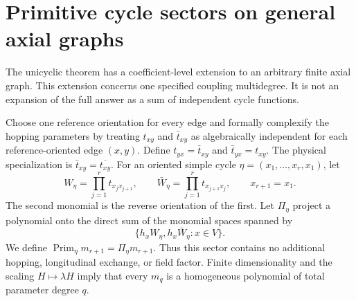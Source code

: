 \section{Primitive cycle sectors on general axial graphs}
\label{sec:primitive-cycles}

The unicyclic theorem has a coefficient-level extension to an arbitrary
finite axial graph.  This extension concerns one specified coupling
multidegree.  It is not an expansion of the full answer as a sum of
independent cycle functions.

Choose one reference orientation for every edge and formally complexify the
hopping parameters by treating $t_{xy}$ and $\bar t_{xy}$ as algebraically
independent for each reference-oriented edge $(x,y)$.  Define
$t_{yx}=\bar t_{xy}$ and $\bar t_{yx}=t_{xy}$.  The physical specialization
is $\bar t_{xy}=\overline{t_{xy}}$.  For an oriented simple cycle
$\eta=(x_1,\ldots,x_r,x_1)$, let
\begin{equation}
 W_\eta=\prod_{j=1}^r t_{x_jx_{j+1}},
 \qquad
 \bar W_\eta=\prod_{j=1}^r t_{x_{j+1}x_j},
 \qquad x_{r+1}=x_1.
 \label{eq:primitive-W-eta}
\end{equation}
The second monomial is the reverse orientation of the first.  Let
$\Pi_\eta$ project a polynomial onto the direct sum of the monomial spaces
spanned by
\begin{equation*}
 \{h_xW_\eta,h_x\bar W_\eta:x\in V\}.
\end{equation*}
We define
$\operatorname{Prim}_\eta m_{r+1}=\Pi_\eta m_{r+1}$.  Thus this sector
contains no additional hopping, longitudinal exchange, or field factor.
Finite dimensionality and the scaling $H\mapsto\lambda H$ imply that every
$m_q$ is a homogeneous polynomial of total parameter degree $q$.

